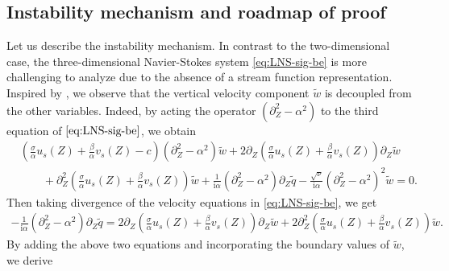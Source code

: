 \documentclass[reqno,11pt]{amsart}
\numberwithin{equation}{section}
\numberwithin{equation}{section}
\theoremstyle{plain}
\newtheorem{remark}[theorem]{Remark}
\begin{document}




\subsection{Instability mechanism and roadmap of proof} Let us describe the instability mechanism. In contrast to the two-dimensional case, the three-dimensional Navier-Stokes system \eqref{eq:LNS-sig-be} is more challenging to analyze due to the absence of a stream function representation. Inspired by  \cite{CWZ3DCoutte}, we observe that the vertical velocity component $\tilde{w}$ is decoupled from the other variables. Indeed,  by acting the operator $(\partial_Z^2-\alpha^2)$ to the third equation of $\eqref{eq:LNS-sig-be}$, we obtain 
\begin{align*}
	&\left(\frac{\sigma}{\alpha}u_s(Z)+\frac{\beta}{\alpha}v_s(Z)-c\right)(\partial_Z^2-\alpha^2)\tilde{w}+2\partial_Z\left(\frac{\sigma}{\alpha}u_s(Z)+\frac{\beta}{\alpha}v_s(Z)\right)\partial_Z\tilde{w}\\ &\qquad+\partial_Z^2\left(\frac{\sigma}{\alpha}u_s(Z)+\frac{\beta}{\alpha}v_s(Z)\right)\tilde{w}
+\frac{1}{\mathrm{i}\alpha}%
(\partial_Z^2-\alpha^2)\partial_Z\tilde{q}-\frac{\sqrt{\nu}}{\mathrm{i}\alpha}(\partial_Z^2-\alpha^2)^2\tilde{w}=0.
\end{align*}
Then taking divergence of the velocity equations in \eqref{eq:LNS-sig-be}, we get
\begin{align*}	-\frac{1}{\mathrm{i}\alpha}%
(\partial_Z^2-\alpha^2)\partial_Z\tilde{q}=2\partial_Z\left(\frac{\sigma}{\alpha}u_s(Z)+\frac{\beta}{\alpha}v_s(Z)\right)\partial_Z\tilde{w}+2\partial_Z^2\left(\frac{\sigma}{\alpha}u_s(Z)+\frac{\beta}{\alpha}v_s(Z)\right)\tilde{w}.
\end{align*}
By adding the above two equations and incorporating the boundary values of $\tilde{w}$, we derive
\end{document}
